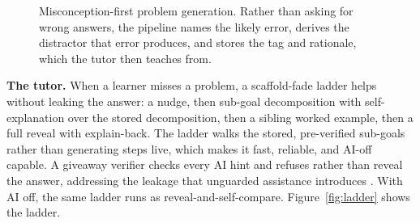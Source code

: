 \documentclass[11pt]{article}
\begin{document}
\begin{figure}[t]
\centering
{}
\caption{Misconception-first problem generation. Rather than asking for wrong answers,
the pipeline names the likely error, derives the distractor that error produces, and
stores the tag and rationale, which the tutor then teaches from.}
\label{fig:probgen}
\end{figure}

\textbf{The tutor.} When a learner misses a problem, a scaffold-fade ladder helps
without leaking the answer: a nudge, then sub-goal decomposition with self-explanation
over the stored decomposition, then a sibling worked example, then a full reveal with
explain-back. The ladder walks the stored, pre-verified sub-goals rather than
generating steps live, which makes it fast, reliable, and AI-off capable. A giveaway
verifier checks every AI hint and refuses rather than reveal the answer, addressing
the leakage that unguarded assistance introduces \citep{bastani2024}. With AI off, the
same ladder runs as reveal-and-self-compare. Figure~\ref{fig:ladder} shows the ladder.
\end{document}
